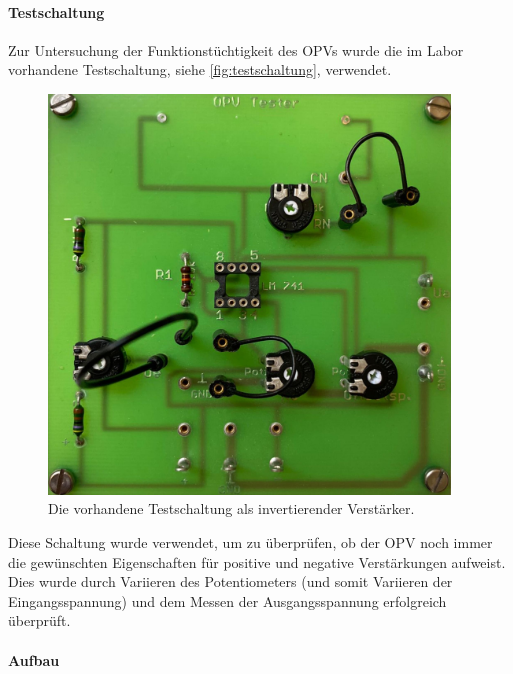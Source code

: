 \documentclass[12pt,english,ngerman]{scrartcl}
\begin{document}
\paragraph{Testschaltung}
Zur Untersuchung der Funktionstüchtigkeit des OPVs wurde die im Labor vorhandene
Testschaltung, siehe \autoref{fig:testschaltung}, verwendet. 

\begin{figure}[H]
  \centering
    \includegraphics[width=0.95\textwidth]{./figures/testschaltung.jpeg}
  \caption{Die vorhandene Testschaltung als invertierender Verstärker.}
  \label{fig:testschaltung}
\end{figure}

Diese Schaltung wurde verwendet, um zu überprüfen, ob der OPV noch immer die
gewünschten Eigenschaften für positive und negative Verstärkungen aufweist. Dies
wurde durch Variieren des Potentiometers (und somit Variieren der
Eingangsspannung) und dem Messen der Ausgangsspannung erfolgreich überprüft.

\paragraph{Aufbau}
\end{document}
